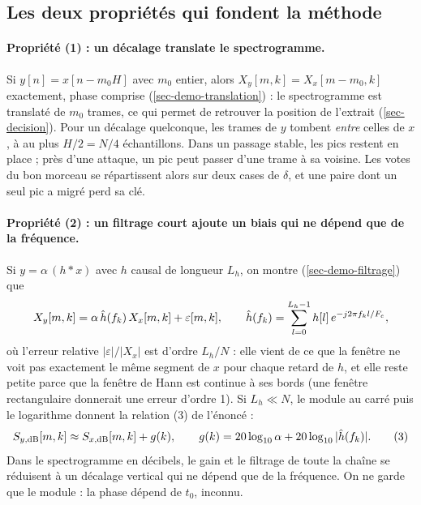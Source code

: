 \subsection{Les deux propriétés qui fondent la méthode}
\label{sec-proprietes}

\paragraph{Propriété (1) : un décalage translate le spectrogramme.} Si
$y[n] = x[n - m_0H]$ avec $m_0$ entier, alors $X_y[m,k] = X_x[m-m_0,k]$ exactement, phase
comprise (\cref{sec-demo-translation}) : le spectrogramme est translaté de $m_0$ trames,
ce qui permet de retrouver la position de l'extrait (\cref{sec-decision}). Pour un décalage
quelconque, les trames de $y$ tombent \emph{entre} celles de $x$, à au plus $H/2 = N/4$
échantillons. Dans un passage stable, les pics restent en place ; près d'une attaque, un pic
peut passer d'une trame à sa voisine. Les votes du bon morceau se répartissent alors sur
deux cases de $\delta$, et une paire dont un seul pic a migré perd sa clé.

\paragraph{Propriété (2) : un filtrage court ajoute un biais qui ne dépend que de la
fréquence.} Si $y = \alpha\,(h * x)$ avec $h$ causal de longueur $L_h$, on montre
(\cref{sec-demo-filtrage}) que
\begin{equation}
  X_y[m,k] = \alpha\,\hat{h}(f_k)\, X_x[m,k] + \varepsilon[m,k],
  \qquad
  \hat{h}(f_k) = \sum_{l=0}^{L_h-1} h[l]\, e^{-j2\pi f_k l/F_e},
  \label{eq-filtrage}
\end{equation}
où l'erreur relative $|\varepsilon|/|X_x|$ est d'ordre $L_h/N$ : elle vient de ce que la
fenêtre ne voit pas exactement le même segment de $x$ pour chaque retard de $h$, et elle
reste petite parce que la fenêtre de Hann est continue à ses bords (une fenêtre
rectangulaire donnerait une erreur d'ordre 1). Si $L_h \ll N$, le module au carré puis le
logarithme donnent la relation (3) de l'énoncé :
\begin{equation}
  S_{y,\mathrm{dB}}[m,k] \approx S_{x,\mathrm{dB}}[m,k] + g(k),
  \qquad g(k) = 20\log_{10}\alpha + 20\log_{10}|\hat{h}(f_k)| .
  \tag{3}
\end{equation}
Dans le spectrogramme en décibels, le gain et le filtrage de toute la chaîne se réduisent à
un décalage vertical qui ne dépend que de la fréquence. On ne garde que le module : la
phase dépend de $t_0$, inconnu.

